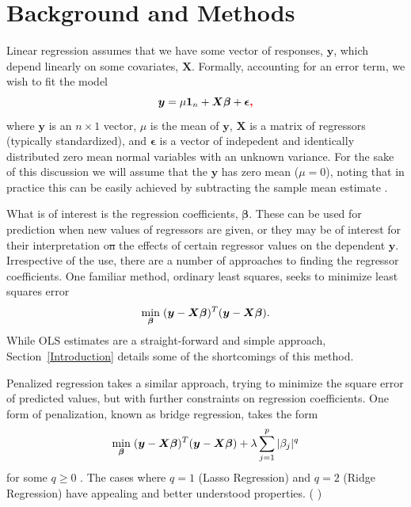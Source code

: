 \documentclass{uwstat572}
\newcommand{\vmdel}[1]{\sout{#1}}
\newcommand{\vmadd}[1]{\textbf{\color{red}{#1}}}
\newcommand{\vmcomment}[1]{({\color{blue}{VM's comment:}} \textbf{\color{blue}{#1}})}
\begin{document}
\section{Background and Methods}
Linear regression assumes that we have some vector of responses, $\boldsymbol{y}$, which depend linearly on some covariates, $\boldsymbol{X}$. Formally, accounting for an error term, we wish to fit the model \[
\boldsymbol{y} = \mu \boldsymbol{1}_n + \boldsymbol{X}\boldsymbol{\beta}+\boldsymbol{\epsilon}\vmadd{,}
\] 
where $\boldsymbol{y}$ is an $n \times 1$ vector, $\mu$ is the mean of $\boldsymbol{y}$, $\boldsymbol{X}$ is a matrix of regressors (typically standardized), and $\boldsymbol{\epsilon}$ is a vector of indepedent and identically distributed zero mean normal variables with an unknown variance. For the sake of this discussion we will assume that the $\boldsymbol{y}$ has zero mean ($\mu=0$), noting that in practice this can be easily achieved by subtracting the sample mean estimate \vmadd{from $\mathbf{y}$}.

What is of interest is the regression coefficients, $\boldsymbol{\beta}$. These can be used for prediction when new values of regressors are given, or they may be of interest for their interpretation o\vmdel{n}\vmadd{f} the effects of certain regressor values on the dependent $\boldsymbol{y}$. Irrespective of the use, there are a number of approaches to finding the regressor coefficients. One familiar method, ordinary least squares, seeks to minimize least squares error\[
\min_{\boldsymbol{\beta}} \hspace{.1cm} (\boldsymbol{y}-\boldsymbol{X}\boldsymbol{\beta})^T(\boldsymbol{y}-\boldsymbol{X}\boldsymbol{\beta}).
\] While OLS estimates are a straight-forward and simple approach, Section~\ref{Introduction} details some of the shortcomings of this method.

Penalized regression takes a similar approach, trying to minimize the square error of predicted values, but with further constraints on regression coefficients. One form of penalization, known as bridge regression, takes the form  \[
\min_{\boldsymbol{\beta}}  \hspace{.1cm} (\boldsymbol{y}-\boldsymbol{X}\boldsymbol{\beta})^T(\boldsymbol{y}-\boldsymbol{X}\boldsymbol{\beta})+\lambda\sum_{j=1}^p|\beta_j|^q
\] for some $q\geq0$ \cite{park2008bayesian}. The cases where $q=1$ (Lasso Regression) and $q=2$ (Ridge Regression) have appealing and better understood properties. 
\vmcomment{Insert original, or as close to original as possible, references for ridge and bridge regression.}
\end{document}
